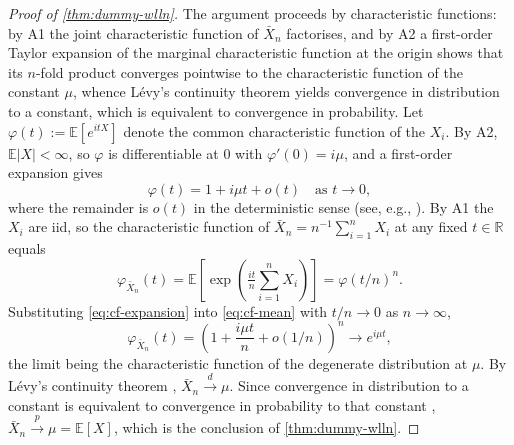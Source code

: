 
\begin{proof}[Proof of \cref{thm:dummy-wlln}]
The argument proceeds by characteristic functions: by A1 the joint characteristic function of $\bar X_n$ factorises, and by A2 a first-order Taylor expansion of the marginal characteristic function at the origin shows that its $n$-fold product converges pointwise to the characteristic function of the constant $\mu$, whence L\'evy's continuity theorem yields convergence in distribution to a constant, which is equivalent to convergence in probability. Let $\varphi(t) := \mathbb{E}[e^{itX}]$ denote the common characteristic function of the $X_i$. By A2, $\mathbb{E}|X| < \infty$, so $\varphi$ is differentiable at $0$ with $\varphi'(0) = i\mu$, and a first-order expansion gives
\begin{equation}\label{eq:cf-expansion}
\varphi(t) = 1 + i\mu t + o(t) \quad \text{as } t \to 0,
\end{equation}
where the remainder is $o(t)$ in the deterministic sense (see, e.g., \textcite[Lemma 2.3.1]{vaart1998}). By A1 the $X_i$ are iid, so the characteristic function of $\bar X_n = n^{-1}\sum_{i=1}^n X_i$ at any fixed $t \in \mathbb{R}$ equals
\begin{equation}\label{eq:cf-mean}
\varphi_{\bar X_n}(t) = \mathbb{E}\!\left[\exp\!\left(\tfrac{it}{n}\sum_{i=1}^n X_i\right)\right] = \varphi(t/n)^n.
\end{equation}
Substituting \eqref{eq:cf-expansion} into \eqref{eq:cf-mean} with $t/n \to 0$ as $n \to \infty$,
\[
\varphi_{\bar X_n}(t) = \left(1 + \frac{i\mu t}{n} + o(1/n)\right)^{n} \longrightarrow e^{i\mu t},
\]
the limit being the characteristic function of the degenerate distribution at $\mu$. By L\'evy's continuity theorem \parencite[Theorem 2.13]{vaart1998}, $\bar X_n \xrightarrow{d} \mu$. Since convergence in distribution to a constant is equivalent to convergence in probability to that constant \parencite[Theorem 2.7(iii)]{vaart1998}, $\bar X_n \xrightarrow{p} \mu = \mathbb{E}[X]$, which is the conclusion of \cref{thm:dummy-wlln}.
\end{proof}
